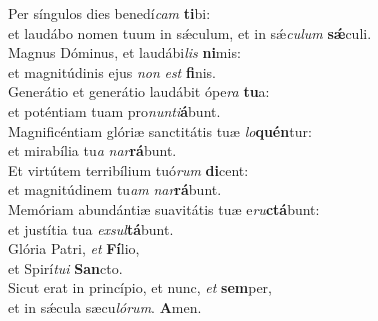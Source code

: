 \evenverse Per síngulos dies benedí\textit{cam} \textbf{ti}bi:~\*\\
\evenverse et laudábo nomen tuum in sǽculum, et in sǽ\textit{cu}\textit{lum} \textbf{sǽ}culi.\\
\oddverse Magnus Dóminus, et laudábi\textit{lis} \textbf{ni}mis:~\*\\
\oddverse et magnitúdinis ejus \textit{non} \textit{est} \textbf{fi}nis.\\
\evenverse Generátio et generátio laudábit ópe\textit{ra} \textbf{tu}a:~\*\\
\evenverse et poténtiam tuam pro\textit{nun}\textit{ti}\textbf{á}bunt.\\
\oddverse Magnificéntiam glóriæ sanctitátis tuæ \textit{lo}\textbf{quén}tur:~\*\\
\oddverse et mirabília tu\textit{a} \textit{nar}\textbf{rá}bunt.\\
\evenverse Et virtútem terribílium tuó\textit{rum} \textbf{di}cent:~\*\\
\evenverse et magnitúdinem tu\textit{am} \textit{nar}\textbf{rá}bunt.\\
\oddverse Memóriam abundántiæ suavitátis tuæ e\textit{ru}\textbf{ctá}bunt:~\*\\
\oddverse et justítia tua \textit{ex}\textit{sul}\textbf{tá}bunt.\\
\evenverse Glória Patri, \textit{et} \textbf{Fí}lio,~\*\\
\evenverse et Spirí\textit{tu}\textit{i} \textbf{San}cto.\\
\oddverse Sicut erat in princípio, et nunc, \textit{et} \textbf{sem}per,~\*\\
\oddverse et in sǽcula sæcu\textit{ló}\textit{rum}. \textbf{A}men.\\
